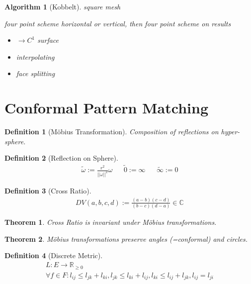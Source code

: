 \documentclass[conference]{IEEEtran}
\newtheorem{algorithm}{Algorithm}
\newtheorem{definition}{Definition}
\newtheorem{theorem}{Theorem}
\begin{document}
\begin{algorithm}[Kobbelt]
	square mesh
	
	
	four point scheme horizontal or vertical, then four point scheme on results
	
	\begin{itemize}
		\item $\rightarrow C^1$ surface
		\item interpolating
		\item face splitting
	\end{itemize}
\end{algorithm}

\section{Conformal Pattern Matching}

\begin{definition}[Möbius Transformation]
	Composition of reflections on hyper-sphere.
\end{definition}

\begin{definition}[Reflection on Sphere]
	\begin{align*}
		\tilde{\omega} := \frac{r^2}{||\omega||^2} \omega && \tilde{0} := \infty && \tilde{\infty} := 0
	\end{align*}
\end{definition}

\begin{definition}[Cross Ratio]
	\begin{align*}
		DV(a,b,c,d) := \frac{(a-b)(c-d)}{(b-c)(d-a)} \in \mathbb{C}
	\end{align*}
\end{definition}

\begin{theorem}
	Cross Ratio is invariant under Möbius transformations.
\end{theorem}

\begin{theorem}
	Möbius transformations preserve angles (=conformal) and circles.
\end{theorem}

\begin{definition}[Discrete Metric]
	\begin{align*}
		L:E \rightarrow \mathbb{R}_{\geq 0}\\
		\forall f \in F: l_{ij} \leq l_{jk} + l_{ki}, l_{jk} \leq l_{ki} + l_{ij}, l_{ki} \leq l_{ij} + l_{jk}, l_{ij} = l_{ji}
	\end{align*}
\end{definition}
\end{document}
